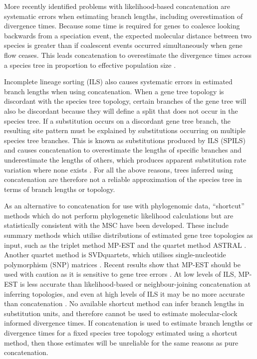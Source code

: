 \documentclass[12pt]{article}
\begin{document}
More recently identified problems with likelihood-based concatenation are
systematic errors when estimating branch lengths, including overestimation of
divergence times. Because some time is required for genes to coalesce
looking backwards from a speciation event, the expected molecular distance
between two species is greater than if coalescent events occurred
simultaneously when
gene flow ceases. This leads concatenation to overestimate the divergence
times across a species tree in proportion to effective population size
\citep{doi:10.1146/annurev.ecolsys.33.010802.150500, Ogilvie01052016}.

Incomplete lineage sorting (ILS) also causes systematic errors in estimated
branch lengths when using concatenation. When a gene tree topology is
discordant with the species tree topology, certain branches of the gene tree
will also be discordant because they will define a split that does not occur
in the species tree. If a substitution occurs on a discordant gene tree
branch, the resulting site pattern must be explained by substitutions
occurring on multiple species tree branches. This is known as substitutions
produced by ILS (SPILS) and causes concatenation to overestimate the lengths
of specific branches and underestimate the lengths of others, which produces
apparent substitution rate variation where none exists \citep{Mendes01072016}.
For all the above reasons, trees inferred using concatenation are therefore
not a reliable approximation of the species tree in terms of branch lengths or
topology.

As an alternative to concatenation for use with phylogenomic data, ``shortcut''
methods which do not perform phylogenetic likelihood calculations but are statistically
consistent with the MSC have been developed. These include summary methods
which utilise distributions of estimated gene tree topologies as input, such as the
triplet method MP-EST \citep{Liu2010} and the quartet method ASTRAL
\citep{Mirarab01092014}. Another quartet method is SVDquartets, which
utilises single-nucleotide polymorphism (SNP) matrices
\citep{doi:10.1093/bioinformatics/btu530}. Recent results show that MP-EST
should be used with caution as it is sensitive to gene tree errors
\citep{Mirarab15062015, Xi201563}. At low levels of ILS, MP-EST is less
accurate than likelihood-based or neighbour-joining concatenation at inferring
topologies, and even at high levels of ILS it may be no more accurate than
concatenation \citep{Ogilvie01052016}. No available
shortcut method can infer branch lengths in substitution units, and
therefore cannot be used to estimate molecular-clock informed divergence
times. If concatenation is used to estimate branch lengths or divergence times
for a fixed species tree topology estimated using a shortcut method,
then those estimates will be unreliable for the same reasons as pure
concatenation.
\end{document}
